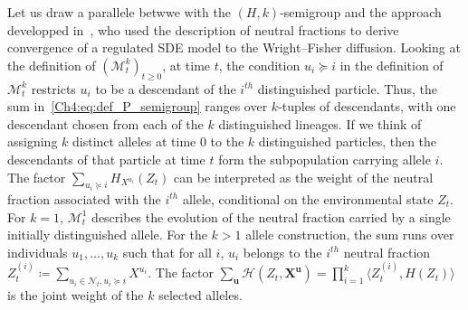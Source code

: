 \begin{refsegment}
 \begin{rem}
  
Let us draw a parallele betwwe with the $(H,k)$-semigroup and the approach developped in~\cite{Julie_Zsofia}, who used the description of neutral fractions to derive convergence of a regulated SDE model to the Wright--Fisher diffusion.
Looking at the definition of $(\mathcal{M}^k_t)_{t\geq 0}$, at time $t$, the condition $u_i\succcurlyeq i$ in the definition of $\mathcal{M}^k_t$ restricts $u_i$ to be a descendant of the $i^{th}$ distinguished particle. Thus, the sum in~\eqref{Ch4:eq:def_P_semigroup} ranges over $k$-tuples of descendants, with one descendant chosen from each of the $k$ distinguished lineages. 
If we think of assigning $k$ distinct alleles at time $0$ to the $k$ distinguished particles, then the descendants of that particle at time $t$ form the subpopulation carrying allele $i$. The factor $\sum_{u_i\succcurlyeq i}H_{X^{u_i}}(Z_t)$ can be interpreted as the weight of the neutral fraction associated with the $i^{th}$ allele, conditional on the environmental state $Z_t$. For $k=1$, $\mathcal M_t^1$ describes the evolution of the neutral fraction carried by a single initially distinguished allele. 
 For the $k>1$ allele construction, the sum runs over individuals $u_1,\ldots, u_k$ such that for all $i$, $u_i$ belongs to the $i^{th}$ neutral fraction $Z^{(i)}_t \coloneqq \sum_{u_i \in \mathcal{N}_t, u_i\succcurlyeq i}X^{u_i}$. 
The factor
$\sum_{\bm u}\mathcal H(Z_t, \bm X^{\bm u})=\prod_{i=1}^k \langle Z^{(i)}_t, H(Z_t)\rangle$ is the joint weight of the $k$ selected alleles.
 \end{rem}


\end{refsegment}
